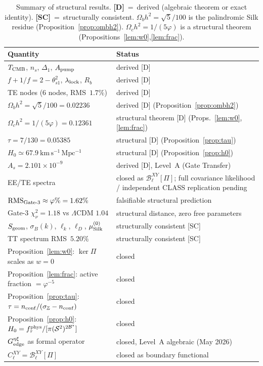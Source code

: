 \documentclass[twocolumn,10pt]{article}
\newcommand{\vp}{\varphi}
\newcommand{\Sgeom}{S_{\rm geom}}
\newcommand{\mustr}{\mu_{\rm Silk}^{(0)}}
\newcommand{\llock}{\lambda_{\rm lock}}
\newcommand{\lD}{\ell_D}
\newcommand{\kerPi}{\ker\Pi}
\begin{document}
\begin{table}[t]
\centering
\small\renewcommand{\arraystretch}{1.2}
\caption{Summary of structural results.
\textbf{[D]}~=~derived (algebraic theorem or exact identity).
\textbf{[SC]}~=~structurally consistent.
$\Omega_bh^2=\sqrt{5}/100$ is the palindromic Silk residue (Proposition~\ref{prop:ombh2}).
$\Omega_ch^2=1/(5\vp)$ is a structural theorem (Propositions~\ref{lem:w0},\ref{lem:frac}).}
\label{tab:epistemic}
\begin{tabular}{p{7cm}p{7cm}}
\toprule
Quantity & Status \\
\midrule
$T_{\rm CMB}$, $n_s$, $\Delta_1$, $A_{\rm pump}$ & derived [D] \\
$f+1/f=2-\theta_{s1}^2$, $\llock$, $R_b$ & derived [D] \\
TE nodes (6 nodes, RMS~$1.7\%$) & derived [D] \\
$\Omega_bh^2=\sqrt{5}/100=0.02236$ & derived [D] (Proposition~\ref{prop:ombh2}) \\
$\Omega_ch^2=1/(5\vp)=0.12361$ & structural theorem [D] (Props.~\ref{lem:w0},\ref{lem:frac}) \\
$\tau=7/130=0.05385$ & structural [D] (Proposition~\ref{prop:tau}) \\
$H_0\simeq67.9~\mathrm{km\,s^{-1}\,Mpc^{-1}}$ & structural [D] (Proposition~\ref{prop:h0}) \\
$A_s=2.101\times10^{-9}$ & derived [D], Level~A (Gate Transfer) \\
EE/TE spectra & closed as $\mathcal{B}_\ell^{XY}[\Pi]$; full covariance likelihood / independent CLASS replication pending \\
$\mathrm{RMS}_{\rm Gate\text{-}3}\approx\vp\%=1.62\%$ & falsifiable structural prediction \\
Gate-3 $\chi^2_\nu=1.18$ vs $\Lambda$CDM $1.04$ & structural distance, zero free parameters \\
$\Sgeom$, $\sigma_B(k)$, $\ell_k$, $\lD$, $\mustr$ & structurally consistent [SC] \\
TT spectrum RMS~$5.20\%$ & structurally consistent [SC] \\
\midrule
Proposition~\ref{lem:w0}: $\kerPi$ scales as $w=0$ & closed \\
Proposition~\ref{lem:frac}: active fraction $=\vp^{-5}$ & closed \\
Proposition~\ref{prop:tau}: $\tau=n_{\rm conf}/(\sigma_{\mathbb{Z}}-n_{\rm conf})$ & closed \\
Proposition~\ref{prop:h0}: $H_0=f_\tau^{\rm phys}/[\pi(\mathcal{S}^2)^{2\mathcal{B}^\star}]$ & closed \\
$G^{\eta\xi}_{\rm edge}$ as formal operator & closed, Level~A algebraic (May 2026) \\
$C_\ell^{XY}=\mathcal{B}_\ell^{XY}[\Pi]$ & closed as boundary functional \\
\bottomrule
\end{tabular}
\end{table}
\end{document}
